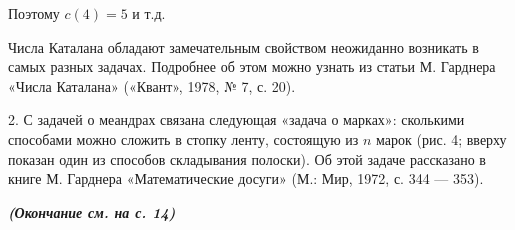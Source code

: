 \documentclass[Main.tex]{subfiles}
\begin{document}
\begin{multicols}{2}
\noindent Поэтому $c(4) = 5$  и т.д.

Числа Каталана обладают замечательным свойством неожиданно возникать в самых разных задачах. Подробнее об этом можно узнать из статьи М. Гарднера «Числа Каталана» («Квант», 1978, № 7, с. 20).

2. С задачей о меандрах связана следующая «задача о марках»: сколькими способами можно сложить в стопку ленту, состоящую из $n$ марок (рис. 4; вверху показан один из способов складывания полоски). Об этой задаче рассказано в книге М. Гарднера «Математические досуги» (М.: Мир, 1972, с. 344 — 353).

\begin{center}
    \textbf{\textit{\tiny{(Окончание см. на с. 14)}}}
\end{center}

\end{multicols}
\end{document}
